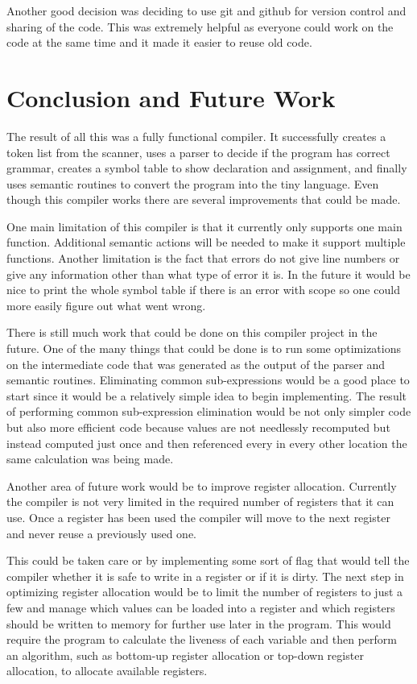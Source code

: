 \documentclass[12pt, oneside]{article}   	%
\begin{document}
Another good decision was deciding to use git and github for version control and sharing of the code. This was extremely helpful as everyone could work on the code at the same time and it made it easier to reuse old code.
\section{Conclusion and Future Work}
The result of all this was a fully functional compiler. It successfully creates a token list from the scanner, uses a parser to decide if the program has correct grammar, creates a symbol table to show declaration and assignment, and finally uses semantic routines to convert the program into the tiny language. Even though this compiler works there are several improvements that could be made.

One main limitation of this compiler is that it currently only supports one main function. Additional semantic actions will be needed to make it support multiple functions. Another limitation is the fact that errors do not give line numbers or give any information other than what type of error it is. In the future it would be nice to print the whole symbol table if there is an error with scope so one could more easily figure out what went wrong.

There is still much work that could be done on this compiler project in the future. One of the many things that could be done is to run some optimizations on the intermediate code that was generated as the output of the parser and semantic routines.
Eliminating common sub-expressions would be a good place to start since it would be a relatively simple idea to begin implementing. The result of performing common sub-expression elimination would be not only simpler code but also more efficient code because values are not needlessly recomputed but instead computed just once and then referenced every in every other location the same calculation was being made.

Another area of future work would be to improve register allocation. Currently the compiler is not very limited in the required number of registers that it can use. Once a register has been used the compiler will move to the next register and never reuse a previously used one.

This could be taken care or by implementing some sort of flag that would tell the compiler whether it is safe to write in a register or if it is dirty. The next step in optimizing register allocation would be to limit the number of registers to just a few and manage which values can be loaded into a register and which registers should be written to memory for further use later in the program. This would require the program to calculate the liveness of each variable and then perform an algorithm, such as bottom-up register allocation or top-down register allocation, to allocate available registers.
\end{document}
